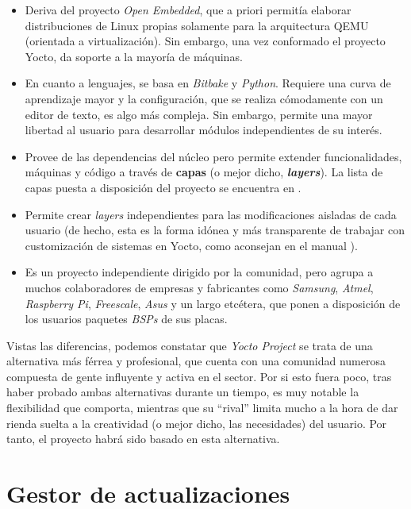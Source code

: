 \begin{itemize}
	\item Deriva del proyecto \textit{Open Embedded}, que a priori permitía elaborar distribuciones de Linux propias solamente para la arquitectura QEMU (orientada a virtualización). Sin embargo, una vez conformado el proyecto Yocto, da soporte a la mayoría de máquinas.
	\item En cuanto a lenguajes, se basa en \textit{Bitbake} y \textit{Python}. Requiere una curva de aprendizaje mayor y la configuración, que se realiza cómodamente con un editor de texto, es algo más compleja. Sin embargo, permite una mayor libertad al usuario para desarrollar módulos independientes de su interés.
	\item Provee de las dependencias del núcleo pero permite extender funcionalidades, máquinas y código a través de \textbf{capas} (o mejor dicho, \textbf{\textit{layers}}). La lista de capas puesta a disposición del proyecto se encuentra en \cite{yocto-layers-list}.
	\item Permite crear \textit{layers} independientes para las modificaciones aisladas de cada usuario (de hecho, esta es la forma idónea y más transparente de trabajar con customización de sistemas en Yocto, como aconsejan en el manual \cite{yocto-manual-own-distro}).
	\item Es un proyecto independiente dirigido por la comunidad, pero agrupa a muchos colaboradores de empresas y fabricantes como \textit{Samsung}, \textit{Atmel}, \textit{Raspberry Pi}, \textit{Freescale}, \textit{Asus} y un largo etcétera, que ponen a disposición de los usuarios paquetes \textit{BSPs} de sus placas.
\end{itemize}

Vistas las diferencias, podemos constatar que \textit{Yocto Project} se trata de una alternativa más férrea y profesional, que cuenta con una comunidad numerosa compuesta de gente influyente y activa en el sector. Por si esto fuera poco, tras haber probado ambas alternativas durante un tiempo, es muy notable la flexibilidad que comporta, mientras que su ``rival'' limita mucho a la hora de dar rienda suelta a la creatividad (o mejor dicho, las necesidades) del usuario. Por tanto, el proyecto habrá sido basado en esta alternativa.

\section{Gestor de actualizaciones}

